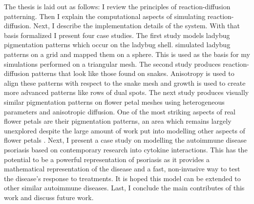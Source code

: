 The thesis is laid out as follows: I review the principles of reaction-diffusion patterning. Then I explain the computational aspects of simulating reaction-diffusion. Next, I describe the implementation details of the \ProgramName{} system. With that basis formalized I present four case studies. The first study models ladybug pigmentation patterns which occur on the ladybug shell. \citep{Liaw2001} simulated ladybug patterns on a grid and mapped them on a sphere. This is used as the basis for my simulations performed on a triangular mesh. The second study produces reaction-diffusion patterns that look like those found on snakes. Anisotropy is used to align these patterns with respect to the snake mesh and growth is used to create more advanced patterns like rows of dual spots. The next study produces visually similar pigmentation patterns on flower petal meshes using heterogeneous parameters and anisotropic diffusion. One of the most striking aspects of real flower petals are their pigmentation patterns, an area which remains largely unexplored despite the large amount of work put into modelling other aspects of flower petals \citep{Owens2016}. Next, I present a case study on modelling the autoimmune disease psoriasis based on contemporary research into cytokine interactions. This has the potential to be a powerful representation of psoriasis as it provides a mathematical representation of the disease and a fast, non-invasive way to test the disease's response to treatments. It is hoped this model can be extended to other similar autoimmune diseases. Last, I conclude the main contributes of this work and discuss future work.